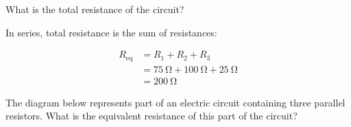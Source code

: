 \documentclass[answers]{exam}
\begin{document}
\begin{questions}

\question
What is the total resistance of the circuit?

\begin{center}
\end{center}

\begin{solutionorbox}[2.0cm]
In series, total resistance is the sum of resistances:

\begin{align*}
    R_\mathrm{eq} &= R_1 + R_2 + R_3 \\[1ex]
    &= \SI{75}{\ohm} + \SI{100}{\ohm} + \SI{25}{\ohm} \\[1ex]
    &= \boxed{\SI{200}{\ohm}}
\end{align*}
\end{solutionorbox}


\question
The diagram below represents part of an electric circuit containing three parallel resistors. What is the equivalent resistance of this part of the circuit?

\begin{minipage}{6cm}
\centering
{}
\end{minipage}%
\end{questions}
\end{document}
